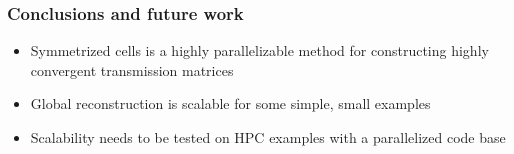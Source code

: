 \documentclass{beamer}
\begin{document}
\begin{frame}
\frametitle{Conclusions and future work}

\begin{itemize}
\item Symmetrized cells is a highly parallelizable method for constructing highly convergent transmission matrices
\item Global reconstruction is scalable for some simple, small examples
\item Scalability needs to be tested on HPC examples with a parallelized code base
\end{itemize}

\end{frame}
\end{document}
